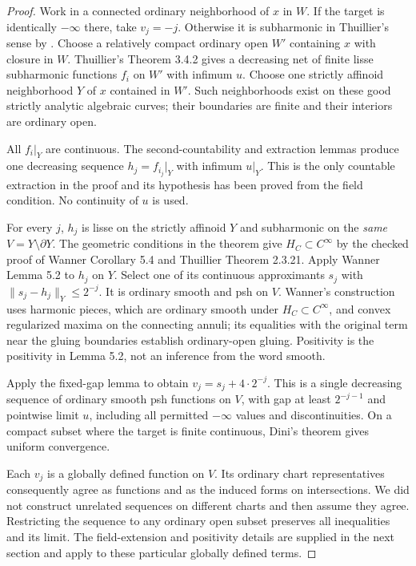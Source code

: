 \documentclass[11pt]{article}
\theoremstyle{remark}
\begin{document}
\begin{proof}
Work in a connected ordinary neighborhood of $x$ in $W$. If the target is
identically $-\infty$ there, take $v_j=-j$. Otherwise it is subharmonic
in Thuillier's sense by \cite[3.4.2 and 4.1.2]{GR}. Choose a relatively
compact ordinary open $W'$ containing $x$ with closure in $W$.
Thuillier's Theorem 3.4.2 gives a decreasing net of finite lisse
subharmonic functions $f_i$ on $W'$ with infimum $u$.
Choose one strictly affinoid neighborhood $Y$ of $x$ contained in $W'$.
Such neighborhoods exist on these good strictly analytic algebraic curves;
their boundaries are finite and their interiors are ordinary open.

All $f_i|_Y$ are continuous. The second-countability and extraction lemmas
produce one decreasing sequence $h_j=f_{i_j}|_Y$ with infimum $u|_Y$.
This is the only countable extraction in the proof and its hypothesis has
been proved from the field condition. No continuity of $u$ is used.

For every $j$, $h_j$ is lisse on the strictly affinoid $Y$ and
subharmonic on the \emph{same} $V=Y\setminus\partial Y$.
The geometric conditions in the theorem give $H_C\subset C^\infty$ by
the checked proof of Wanner Corollary 5.4 and Thuillier Theorem 2.3.21.
Apply Wanner Lemma 5.2 to $h_j$ on $Y$. Select one of its continuous
approximants $s_j$ with
$\|s_j-h_j\|_Y\leq2^{-j}$. It is ordinary smooth and psh on $V$.
Wanner's construction uses harmonic pieces, which are ordinary smooth
under $H_C\subset C^\infty$, and convex regularized maxima on the connecting
annuli; its equalities with the original term near the gluing boundaries
establish ordinary-open gluing. Positivity is the positivity in Lemma 5.2,
not an inference from the word smooth.

Apply the fixed-gap lemma to obtain $v_j=s_j+4\cdot2^{-j}$. This is a
single decreasing sequence of ordinary smooth psh functions on $V$, with
gap at least $2^{-j-1}$ and pointwise limit $u$, including all permitted
$-\infty$ values and discontinuities. On a compact subset where the target
is finite continuous, Dini's theorem gives uniform convergence.

Each $v_j$ is a globally defined function on $V$. Its ordinary chart
representatives consequently agree as functions and as the induced
forms on intersections. We did not construct unrelated sequences on
different charts and then assume they agree. Restricting the sequence
to any ordinary open subset preserves all inequalities and its limit.
The field-extension and positivity details are supplied in the next
section and apply to these particular globally defined terms.
\end{proof}
\end{document}
